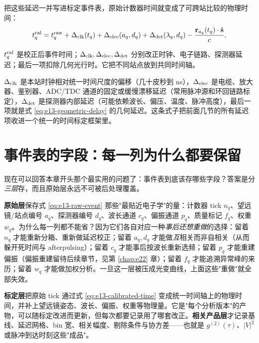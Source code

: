 把这些延迟一并写进标定事件表，原始计数器时间就变成了可跨站比较的物理时间：
\begin{equation}
  t^{\rm cal}_q =
  t^{\rm raw}_q
  +\Delta_{\rm clk}(t_q)
  +\Delta_{\rm elec}(a_q,d_q)
  +\Delta_{\rm det}(\lambda_q,d_q)
  -\frac{\mathbf{r}_{a_q}(t_q)\cdot\hat{\mathbf{s}}}{c}.
  \label{eq:e13-calibrated-time}
\end{equation}
\begin{formulaexplain}
\(t_q^{\rm cal}\) 是校正后事件时间；\(\Delta_{\rm clk},\Delta_{\rm elec},\Delta_{\rm det}\) 分别改正时钟、电子链路、探测器延迟；最后一项扣除几何光行时。它把不同站点放到共同时间轴。
\end{formulaexplain}
\(\Delta_{\rm clk}\) 是本站时钟相对统一时间尺度的偏移（几十皮秒到 ns），\(\Delta_{\rm elec}\) 是电缆、放大器、鉴别器、ADC/TDC 通道的固定或缓慢漂移延迟（常用脉冲源和环回链路标定），\(\Delta_{\rm det}\) 是探测器内部延迟（可能依赖波长、偏压、温度、脉冲高度），最后一项就是式 \eqref{eq:e13-geometric-delay} 的几何延迟。这条式子把前面几节的所有延迟项收进一个统一的时间标定框架里。

\section{事件表的字段：每一列为什么都要保留}
\label{sec:e13-schema}

现在可以回答本章开头那个最实用的问题了：事件表到底该存哪些字段？答案是分\emph{三层}存，而且原始层永远不可被后处理覆盖。

\textbf{原始层}保存式 \eqref{eq:e13-raw-event} 那些"最贴近电子学"的量：计数器 tick \(n_q\)、望远镜/站点编号 \(a_q\)、探测器编号 \(d_q\)、波长通道 \(c_q\)、偏振通道 \(p_q\)、质量标记 \(f_q\)、权重 \(w_q\)。为什么每一列都不能省？因为它们各自对应一种\emph{事后还想重做}的选择：留着 \(n_q\) 才能重新分箱、重新做延迟校正；留着 \(a_q,d_q\) 才能做\emph{互}相关而非自相关（从而躲开死时间与 afterpulsing）；留着 \(c_q\) 才能事后按波长重新选频；留着 \(p_q\) 才能重建偏振（偏振重建留待后续章节，见第 \ref{chap:e22} 章）；留着 \(f_q\) 才能追溯异常峰的来历；留着 \(w_q\) 才能做加权分析。一旦这一层被压成光变曲线，上面这些"重做"就全部失效。

\textbf{标定层}把原始 tick 通过式 \eqref{eq:e13-calibrated-time} 变成统一时间轴上的物理时间，并补上望远镜姿态、波长、偏振、权重等物理量。它是"每个分析版本"的产物，可以随标定改进而更新，但每次都要记录用了哪套改正。\textbf{相关产品层}才记录基线、延迟网格、bin 宽、相关幅度、剔除条件与协方差——也就是 \(g^{(2)}(\tau)\)、\(|V|^2\) 或脉冲到达时刻这些"成品"。

